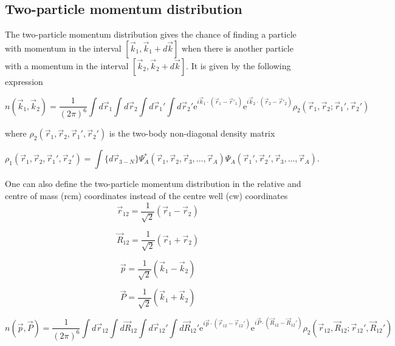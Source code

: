 \documentclass[12pt]{article}
\begin{document}
\subsection{Two-particle momentum distribution}

The two-particle momentum distribution gives the chance of finding a particle with momentum in the interval $[\vec{k}_1,\vec{k}_1+d\vec{k}]$ when there is another particle with a momentum in the interval $[\vec{k}_2,\vec{k}_2+d\vec{k}]$. It is given by the following expression

\begin{equation}
n(\vec{k}_1,\vec{k}_2)=\frac{1}{(2\pi)^6}\int d\vec{r}_1 \int d\vec{r}_2 \int  
    						d\vec{r}_1' \int d\vec{r}_2' 
    						\mathrm{e}^{i\vec{k}_1\cdot (\vec{r}_1-\vec{r}'_1)} 
    						\mathrm{e}^{i\vec{k}_2\cdot(\vec{r}_2-\vec{r}'_2)}
    						\rho_2(\vec{r}_1,\vec{r}_2; \vec{r}_1',\vec{r}_2')
\end{equation}

where $\rho_2(\vec{r}_1,\vec{r}_2, \vec{r}_1',\vec{r}_2')$ is the two-body non-diagonal density matrix


\begin{equation}
\rho_1(\vec{r}_1,\vec{r}_2, \vec{r}_1',\vec{r}_2') = \int \{d\vec{r}_{3-N}\} \Psi^*_A(\vec{r}_1,\vec{r}_2,\vec{r}_3, ... ,\vec{r}_A)\Psi_A(\vec{r}_1',\vec{r}_2',\vec{r}_3, ... ,\vec{r}_A).
\end{equation}

One can also define the two-particle momentum distribution in the relative and centre of mass (rcm) coordinates instead of the centre well (cw) coordinates
\begin{equation}
\vec{r}_{12}= \frac{1}{\sqrt{2}} \left(\vec{r}_1 - \vec{r}_2\right)  
\end{equation}

\begin{equation}
\vec{R}_{12}= \frac{1}{\sqrt{2}} \left(\vec{r}_1 + \vec{r}_2\right)
\end{equation}

\begin{equation}
\vec{p}= \frac{1}{\sqrt{2}} \left(\vec{k}_1 - \vec{k}_2\right)
\end{equation}

\begin{equation}
\vec{P}= \frac{1}{\sqrt{2}} \left(\vec{k}_1 + \vec{k}_2\right)
\end{equation}


\begin{equation}
n(\vec{p},\vec{P})=\frac{1}{(2\pi)^6}
						\int d\vec{r}_{12} \int d\vec{R}_{12} \int d\vec{r}_{12}' \int d\vec{R}_{12}' 
    						\mathrm{e}^{i\vec{p}\cdot (\vec{r}_{12}-\vec{r}_{12}')} 
    						\mathrm{e}^{i\vec{P}\cdot(\vec{R}_{12}-\vec{R}_{12}')} 
    						\rho_2(\vec{r}_{12},\vec{R}_{12}; \vec{r}_{12}',\vec{R}_{12}')
\end{equation}
\end{document}
